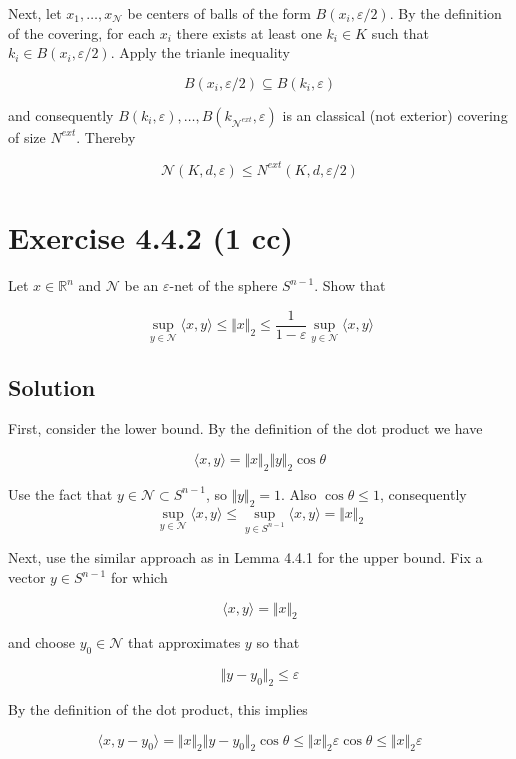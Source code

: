 \documentclass{article}
\begin{document}
Next, let $x_1, \dots, x_{\mathcal N}$ be centers of balls of the form $B(x_i, \varepsilon/2)$. By the definition of the covering, for each $x_i$ there exists at least one $k_i \in K$ such that $k_i \in B(x_i, \varepsilon/2)$. Apply the trianle inequality

$$B(x_i, \varepsilon/2) \subseteq B(k_i, \varepsilon)$$

and consequently $B({k_i}, \varepsilon), \dots, B(k_{\mathcal N^{ext}}, \varepsilon)$ is an classical (not exterior) covering of size $N^{ext}$. Thereby

$$\mathcal N (K, d, \varepsilon) \leq N^{ext}(K, d, \varepsilon/2)$$

\section{Exercise 4.4.2 (1 cc)}

Let $x \in \mathbb R^n$ and $ \mathcal N$ be an $\varepsilon$-net of the sphere $S^{n-1}$. Show that

$$\sup_{y \in \mathcal N} \langle x, y \rangle \leq \Vert x \Vert_2 \leq \frac{1}{1-\varepsilon}\sup_{y \in \mathcal N}\langle x, y \rangle$$

\subsection{Solution}

First, consider the lower bound. By the definition of the dot product we have

$$\langle x, y \rangle = \Vert x \Vert_2 \Vert y \Vert_2 \cos \theta$$

Use the fact that $y \in \mathcal N \subset S^{n-1}$, so $\Vert y \Vert_2 = 1$. Also $\cos \theta \leq 1$, consequently
$$\sup_{y \in \mathcal N} \langle x, y \rangle \leq \sup_{y \in S^{n-1}} \langle x, y \rangle = \Vert x \Vert_2$$

Next, use the similar approach as in Lemma 4.4.1 for the upper bound. Fix a vector $y \in S^{n-1}$ for which

$$\langle x, y \rangle = \Vert x \Vert_2 $$

and choose $y_0 \in \mathcal N$ that approximates $y$ so that

$$\Vert y - y_0 \Vert_2 \leq \varepsilon$$

By the definition of the dot product, this implies

$$\langle x, y - y_0 \rangle = \Vert x \Vert_2 \Vert y - y_0 \Vert_2 \cos \theta \leq  \Vert x \Vert_2 \varepsilon \cos \theta \leq \Vert x \Vert_2 \varepsilon$$
\end{document}
